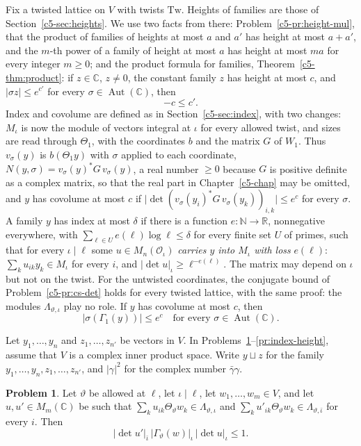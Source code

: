 \documentclass[reqno]{amsart}
\newcounter{chap}
\theoremstyle{definition}
\newtheorem{problem}{Problem}[section]
\theoremstyle{plain}
\theoremstyle{remark}
\newcommand{\R}{\mathbb{R}}
\newcommand{\C}{\mathbb{C}}
\newcommand{\Oc}{\mathcal{O}}
\newcommand{\Aut}{\operatorname{Aut}}
\begin{document}
Fix a twisted lattice on \(V\) with twists \(\mathrm{Tw}\).  Heights of families are those of Section~\ref{c5-sec:heights}.  We use two facts from there: Problem~\ref{c5-pr:height-mul}, that the product of families of heights at most \(a\) and \(a'\) has height at most \(a+a'\), and the \(m\)-th power of a family of height at most \(a\) has height at most \(ma\) for every integer \(m\ge0\); and the product formula for families, Theorem~\ref{c5-thm:product}: if \(z \in \C\), \(z \ne 0\), the constant family \(z\) has height at most \(c\), and \(\lvert \sigma z \rvert \le e^{c'}\) for every \(\sigma \in \Aut(\C)\), then
\[
  -c \le c' .
\]
Index and covolume are defined as in Section~\ref{c5-sec:index}, with two changes: \(M_\iota\) is now the module of vectors integral at \(\iota\) for every allowed twist, and sizes are read through \(\Theta_1\), with the coordinates \(b\) and the matrix \(G\) of \(W_1\).  Thus \(v_\sigma(y)\) is \(b(\Theta_1 y)\) with \(\sigma\) applied to each coordinate, \(N(y, \sigma) = v_\sigma(y)^* G\, v_\sigma(y)\), a real number \(\ge 0\) because \(G\) is positive definite as a complex matrix, so that the real part in Chapter~\ref{c5-chap} may be omitted, and \(y\) has covolume at most \(c\) if \(\lvert \det(v_\sigma(y_i)^* G\, v_\sigma(y_k))_{i,k} \rvert \le e^c\) for every \(\sigma\).  A family \(y\) has index at most \(\delta\) if there is a function \(e\colon \mathbb{N} \to \R\), nonnegative everywhere, with \(\sum_{\ell \in U} e(\ell) \log \ell \le \delta\) for every finite set \(U\) of primes, such that for every \(\iota \mid \ell\) some \(u \in M_n(\Oc_\iota)\) \emph{carries \(y\) into \(M_\iota\) with loss} \(e(\ell)\): \(\sum_k u_{ik} y_k \in M_\iota\) for every \(i\), and \(\lvert \det u \rvert_\iota \ge \ell^{-e(\ell)}\).  The matrix may depend on \(\iota\) but not on the twist.  For the untwisted coordinates, the conjugate bound of Problem~\ref{c5-pr:cs-det} holds for every twisted lattice, with the same proof: the modules \(\Lambda_{\vartheta,\iota}\) play no role.  If \(y\) has covolume at most \(c\), then
\[
  \lvert \sigma(\Gamma_1(y)) \rvert \le e^c \quad \text{for every } \sigma \in \Aut(\C).
\]

Let \(y_1,\dots,y_n\) and \(z_1,\dots,z_{n'}\) be vectors in \(V\).  In Problems~\ref{pr:val}--\ref{pr:index-height}, assume that \(V\) is a complex inner product space.  Write \(y \sqcup z\) for the family \(y_1, \dots, y_n, z_1, \dots, z_{n'}\), and \(\lvert\gamma\rvert^2\) for the complex number \(\bar\gamma\gamma\).

\begin{problem}\label{pr:val}
Let \(\vartheta\) be allowed at \(\ell\), let \(\iota \mid \ell\), let \(w_1, \dots, w_m \in V\), and let \(u, u' \in M_m(\C)\) be such that \(\sum_k u_{ik} \Theta_\vartheta w_k \in \Lambda_{\vartheta, \iota}\) and \(\sum_k u'_{ik} \Theta_\vartheta w_k \in \Lambda_{\vartheta, \bar\iota}\) for every \(i\).  Then
\[
  \lvert \det u' \rvert_{\bar\iota} \, \lvert \Gamma_\vartheta(w) \rvert_\iota \, \lvert \det u \rvert_\iota \le 1 .
\]
\end{problem}
\end{document}

